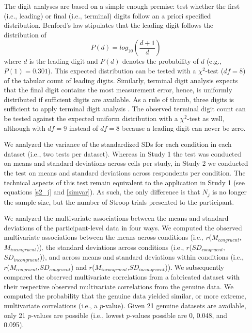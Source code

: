 \documentclass{article}
\begin{document}
The digit analyses are based on a simple enough premise: test whether the first (i.e., leading) or final (i.e., terminal) digits follow an a priori specified distribution. Benford's law \citep{Benford1938-fl} stipulates that the leading digit follows the distribution of 
\begin{equation}
P(d)=log_{10}(\frac{d+1}{d})
\label{benford}
\end{equation}
where $d$ is the leading digit and $P(d)$ denotes the probability of $d$ (e.g., $P(1)=0.301$). This expected distribution can be tested with a $\chi^2$-test ($df=8$) of the tabular count of leading digits. Similarly, terminal digit analysis \citep{Mosimann1995-av,Mosimann2002-oj} expects that the final digit contains the most measurement error, hence, is uniformly distributed if sufficient digits are available. As a rule of thumb, three digits is sufficient to apply terminal digit analysis \citep{Mosimann1995-av,Mosimann2002-oj}. The observed terminal digit count can be tested against the expected uniform distribution with a $\chi^2$-test as well, although with $df=9$ instead of $df=8$ because a leading digit can never be zero.

We analyzed the variance of the standardized SDs for each condition in each dataset (i.e., two tests per dataset). Whereas in Study 1 the test was conducted on means and standard deviations across cells per study, in Study 2 we conducted the test on means and standard deviations across respondents per condition. The technical aspects of this test remain equivalent to the application in Study 1 (see equations \ref{s2_j} and \ref{simvar}). As such, the only difference is that $N_j$ is no longer the sample size, but the number of Stroop trials presented to the participant.

We analyzed the multivariate associations between the means and standard deviations of the participant-level data in four ways. We computed the observed multivariate associations between the means across conditions (i.e., $r$($M_{congruent}$,$M_{incongruent}$)), the standard deviations across conditions (i.e., $r$($SD_{congruent}$,$SD_{incongruent}$)), and across means and standard deviations within conditions (i.e., $r$($M_{congruent}$,$SD_{congruent}$) and $r$($M_{incongruent}$,$SD_{incongruent}$)). We subsequently compared the observed multivariate correlations from a fabricated dataset with their respective observed multivariate correlations from the genuine data. We computed the probability that the genuine data yielded similar, or more extreme, multivariate correlations (i.e., a $p$-value). Given 21 genuine datasets are available, only 21 $p$-values are possible (i.e., lowest $p$-values possible are 0, 0.048, and 0.095).
\end{document}
